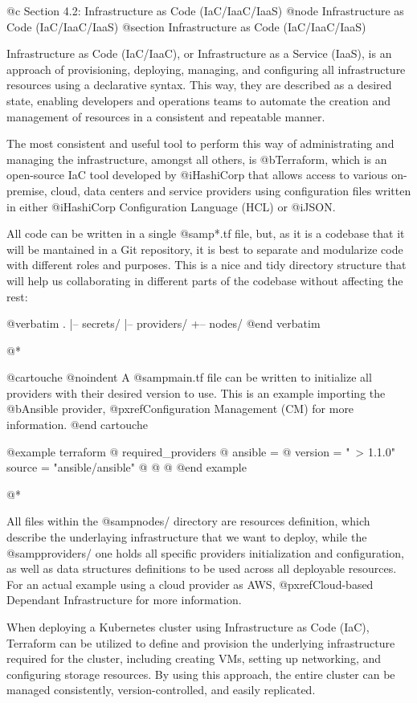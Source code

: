 @c Section 4.2: Infrastructure as Code (IaC/IaaC/IaaS)
@node Infrastructure as Code (IaC/IaaC/IaaS)
@section Infrastructure as Code (IaC/IaaC/IaaS)

Infrastructure as Code (IaC/IaaC), or Infrastructure as a Service (IaaS), is an approach of provisioning, deploying, managing, and configuring all infrastructure resources using a declarative syntax. This way, they are described as a desired state, enabling developers and operations teams to automate the creation and management of resources in a consistent and repeatable manner.

The most consistent and useful tool to perform this way of administrating and managing the infrastructure, amongst all others, is @b{Terraform}, which is an open-source IaC tool developed by @i{HashiCorp} that allows access to various on-premise, cloud, data centers and service providers using configuration files written in either @i{HashiCorp Configuration Language (HCL)} or @i{JSON}.

All code can be written in a single @samp{*.tf} file, but, as it is a codebase that it will be mantained in a Git repository, it is best to separate and modularize code with different roles and purposes. This is a nice and tidy directory structure that will help us collaborating in different parts of the codebase without affecting the rest:

@verbatim
.
|-- secrets/
|-- providers/
+-- nodes/
@end verbatim

@*

@cartouche
@noindent A @samp{main.tf} file can be written to initialize all providers with their desired version to use. This is an example importing the @b{Ansible} provider, @pxref{Configuration Management (CM)} for more information.
@end cartouche

@example
terraform @{
  required_providers @{
    ansible = @{
      version = "~> 1.1.0"
      source = "ansible/ansible"
    @}
  @}
@}
@end example

@*

All files within the @samp{nodes/} directory are resources definition, which describe the underlaying infrastructure that we want to deploy, while the @samp{providers/} one holds all specific providers initialization and configuration, as well as data structures definitions to be used across all deployable resources. For an actual example using a cloud provider as AWS, @pxref{Cloud-based Dependant Infrastructure} for more information.

When deploying a Kubernetes cluster using Infrastructure as Code (IaC), Terraform can be utilized to define and provision the underlying infrastructure required for the cluster, including creating VMs, setting up networking, and configuring storage resources. By using this approach, the entire cluster can be managed consistently, version-controlled, and easily replicated.
